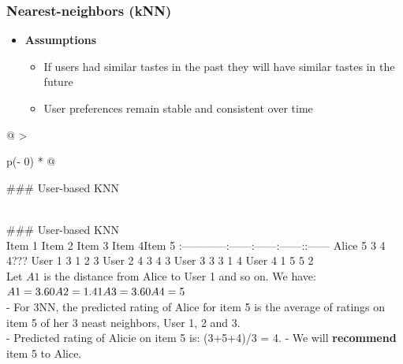 \documentclass[
]{article}
\providecommand{\tightlist}{%
  \setlength{\itemsep}{0pt}\setlength{\parskip}{0pt}}
\begin{document}
\hypertarget{nearest-neighbors-knn}{%
\subsubsection{Nearest-neighbors (kNN)}\label{nearest-neighbors-knn}}

\begin{itemize}
\tightlist
\item
  \textbf{Assumptions}

  \begin{itemize}
  \tightlist
  \item
    If users had similar tastes in the past they will have similar
    tastes in the future
  \item
    User preferences remain stable and consistent over time
  \end{itemize}
\end{itemize}

\begin{longtable}[]{@{}
  >{\raggedright\arraybackslash}p{(\columnwidth - 0\tabcolsep) * }@{}}
\toprule
\begin{minipage}[b]{\linewidth}\raggedright
\#\#\# User-based KNN
\end{minipage} \\
\midrule
\endhead
\#\#\# User-based KNN \\
\textbar{} \textbar{} Item 1\textbar{} Item 2\textbar{} Item 3\textbar{}
Item 4\textbar Item 5 \textbar{}
\textbar:------\textbar------:\textbar------:\textbar------:\textbar------:\textbar:------\textbar{}
\textbar Alice \textbar{} 5\textbar{} 3\textbar{} 4\textbar{}
4\textbar??? \textbar{} \textbar User 1 \textbar{} 3\textbar{}
1\textbar{} 2\textbar{} 3 \textbar{} \textbar User 2 \textbar{}
4\textbar{} 3\textbar{} 4\textbar{} 3 \textbar{} \textbar User
3 \textbar{} 3\textbar{} 3\textbar{} 1\textbar{} 4 \textbar{}
\textbar User 4 \textbar{} 1\textbar{} 5\textbar{} 5\textbar{}
2 \textbar{} \\
Let \(A1\) is the distance from Alice to User 1 and so on. We have: \\
\(
A1 = 3.60 \\
A2 = 1.41 \\
A3 = 3.60 \\
A4 = 5
\) \\
- For 3NN, the predicted rating of Alice for item 5 is the average of
ratings on item 5 of her 3 neast neighbors, User 1, 2 and 3. \\
- Predicted rating of Alicie on item 5 is: (3+5+4)/3 = 4. - We will
\textbf{recommend} item 5 to Alice. \\
\bottomrule
\end{longtable}
\end{document}
